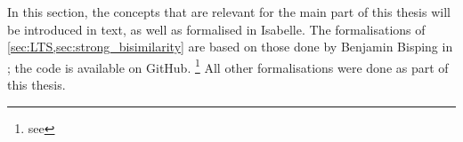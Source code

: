 %
\begin{isabellebody}%
%
%
\isadelimtheory
%
\endisadelimtheory
%
\isatagtheory
%
\endisatagtheory
{\isafoldtheory}%
%
\isadelimtheory
%
\endisadelimtheory
%
\isadelimdocument
%
\endisadelimdocument
%
\isatagdocument
%
\isamarkuptrue%
%
\endisatagdocument
{\isafolddocument}%
%
\isadelimdocument
%
\endisadelimdocument
%
\begin{isamarkuptext}%
\label{chap:foundations}%
\end{isamarkuptext}\isamarkuptrue%
%
\begin{isamarkuptext}%
In this section, the concepts that are relevant for the main part of this thesis will be introduced in text, as well as formalised in Isabelle. The formalisations of \cref{sec:LTS,sec:strong_bisimilarity} are based on those done by Benjamin Bisping in \cite{bisping2018computing}; the code is available on GitHub.%
\footnote{see }
All other formalisations were done as part of this thesis.%
\end{isamarkuptext}\isamarkuptrue%
%
\isadelimtheory
%
\endisadelimtheory
%
\isatagtheory
%
\endisatagtheory
{\isafoldtheory}%
%
\isadelimtheory
%
\endisadelimtheory
%
\end{isabellebody}%
\endinput
